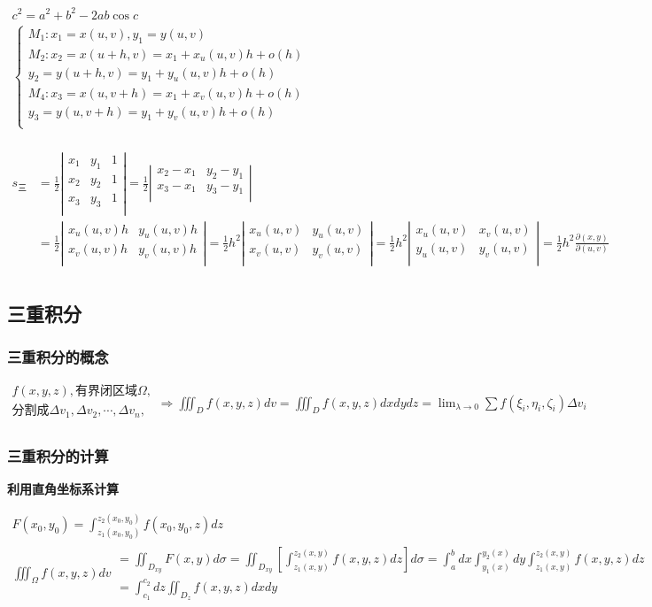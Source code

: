 \documentclass[UTF8]{ctexart}
\newcommand{\mt}[1]{\text{#1}}
\newcommand{\mb}[1]{\textbf{#1}}
\newcommand{\mf}[1]{\left( #1\right)}
\newcommand{\mfa}[1]{\left| #1\right|}
\newcommand{\mfc}[1]{\left[ #1 \right]}
\newcommand{\p}{\par}
\newcommand{\ma}[1]{\begin{array}{llll} #1 \end{array}}
\newcommand{\da}[2]{\frac{\partial #1}{\partial #2}}
\newcommand{\fcz}[1] {
    \left\{
        \begin{array}{llll} #1 \end{array}
    \right.
}
\begin{document}
$\ma{c^2=a^2+b^2-2ab\cos c\\
    \fcz{
        M_1:x_1=x\mf{u,v},y_1=y\mf{u,v}\\
        M_2:x_2=x\mf{u+h,v}=x_1+x_u\mf{u,v}h+o\mf{h}\\
            y_2=y\mf{u+h,v}=y_1+y_u\mf{u,v}h+o\mf{h}\\
        M_4:x_3=x\mf{u,v+h}=x_1+x_v\mf{u,v}h+o\mf{h}\\
            y_3=y\mf{u,v+h}=y_1+y_v\mf{u,v}h+o\mf{h}\\
    }\\}$\p
$
\ma{
    s_{\mt{三角形}}&=\frac{1}{2}\mfa{\ma{
        x_1 &y_1 &1 \\
        x_2 &y_2 &1 \\
        x_3 &y_3 &1 \\
    }}=\frac{1}{2}\mfa{\ma{
        x_2-x_1 &y_2-y_1  \\
        x_3-x_1 &y_3-y_1  \\
    }}\\
    &=\frac{1}{2}\mfa{\ma{
        x_u\mf{u,v}h  &y_u\mf{u,v}h\\
        x_v\mf{u,v}h  &y_v\mf{u,v}h\\
    }}=\frac{1}{2}h^2\mfa{\ma{
        x_u\mf{u,v}  &y_u\mf{u,v}\\
        x_v\mf{u,v}  &y_v\mf{u,v}\\
    } 
    }=\frac{1}{2}h^2\mfa{\ma{
        x_u\mf{u,v}  &x_v\mf{u,v}\\
        y_u\mf{u,v}  &y_v\mf{u,v}\\
    }}=\frac{1}{2}h^2 \da{\mf{x,y}}{\mf{u,v}}\\

}
$

\subsection{三重积分}

\subsubsection{三重积分的概念}
$\ma{f\mf{x,y,z},\mt{有界闭区域}\Omega ,\\
\mt{分割成} \Delta v_1,\Delta v_2,\cdots,\Delta v_n,\\}\Rightarrow
\iiint_D f\mf{x,y,z}dv=\iiint_D f\mf{x,y,z}dxdydz=\lim_{\lambda \rightarrow 0}\sum f\mf{\xi_i,\eta_i,\zeta_i }\Delta v_i
$
\subsubsection{三重积分的计算}
\mb{利用直角坐标系计算}\p
$\ma{F\mf{x_0,y_0}=\int_{z_1\mf{x_0,y_0}}^{z_2\mf{x_0,y_0}}f\mf{x_0,y_0,z}dz\\
\iiint_{\Omega}f\mf{x,y,z}dv\ma{
=\iint_{D_{xy}} F\mf{x,y}d\sigma=\iint_{D_{xy}}\mfc{\int_{z_1\mf{x,y}}^{z_2\mf{x,y}}f\mf{x,y,z}dz}d\sigma
=\int_a^b dx \int_{y_1\mf{x}}^{y_2\mf{x}} dy \int_{z_1\mf{x,y}}^{z_2\mf{x,y}} f\mf{x,y,z}dz\\
=\int_{c_1}^{c_2}dz\iint_{D_z}f\mf{x,y,z}dxdy
}
}$
\end{document}
